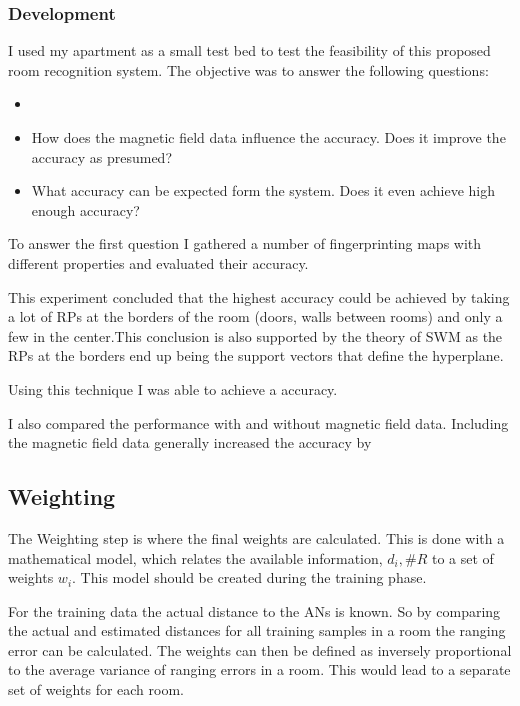 \subsubsection{Development}
\label{overviewRoomRecognition}
I used my apartment as a small test bed to test the feasibility of this proposed room recognition system. The objective was to answer the following questions:
\begin{itemize}
\item {}
\item How does the magnetic field data influence the accuracy. Does it improve the accuracy as presumed?
\item What accuracy can be expected form the system. Does it even achieve high enough accuracy?
\end{itemize}

To answer the first question I gathered a number of fingerprinting maps with different properties and evaluated their accuracy.

This experiment concluded that the highest accuracy could be achieved by taking a lot of RPs at the borders of the room (doors, walls between rooms) and only a few in the center.This conclusion is also supported by the theory of SWM as the RPs at the borders end up being the support vectors that define the hyperplane.

Using this technique I was able to achieve a  accuracy. 

I also compared the performance with and without magnetic field data. Including the magnetic field data generally increased the accuracy by 

\subsection{Weighting}

The Weighting step is where the final weights are calculated. This is done with a mathematical model, which relates the available information, \(d_i,\#R\) to a set of weights \(w_i\). This model should be created during the training phase.

For the training data the actual distance to the ANs is known. So by comparing the actual and estimated distances for all training samples in a room the ranging error can be calculated. The weights can then be defined as inversely proportional to the average variance of ranging errors in a room. This would lead to a separate set of weights for each room.

